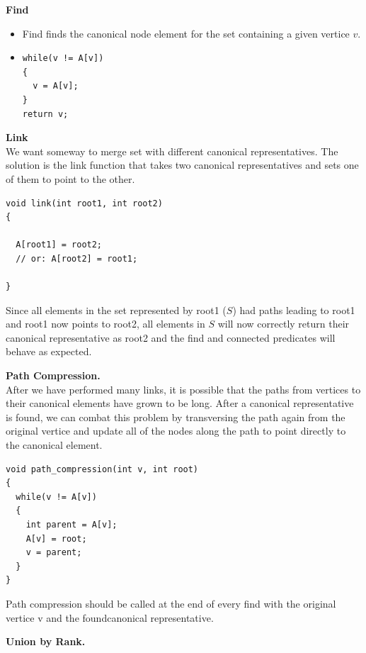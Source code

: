 \documentclass[11pt]{article}
\begin{document}
\textbf{Find}\\
\begin{itemize}
\item Find finds the canonical node element for the set containing a given vertice $v$.
\item
\begin{verbatim}
while(v != A[v])
{
  v = A[v];
}
return v;
\end{verbatim}

\end{itemize}


\textbf{Link}\\

We want someway to merge set with different canonical representatives. The solution is the link function that takes two canonical representatives and sets one of them to point to the other.

\begin{verbatim}
void link(int root1, int root2)
{

  A[root1] = root2;
  // or: A[root2] = root1;

}
\end{verbatim}

Since all elements in the set represented by root1 ($S$) had paths leading to root1 and root1 now points to root2, all elements in $S$ will now correctly return their canonical representative as root2 and the find and connected predicates will behave as expected.

\newpage

\textbf{Path Compression.}\\

After we have performed many links, it is possible that the paths from vertices to their canonical elements have grown to be long. After a canonical representative is found, we can combat this problem by transversing the path again from the original vertice and update all of the nodes along the path to point directly to the canonical element.

\begin{verbatim}
void path_compression(int v, int root)
{
  while(v != A[v])
  {
    int parent = A[v];
    A[v] = root;
    v = parent;
  }
}
\end{verbatim}

Path compression should be called at the end of every find with the original vertice v and the foundcanonical representative.


\textbf{Union by Rank.}\\
\end{document}
